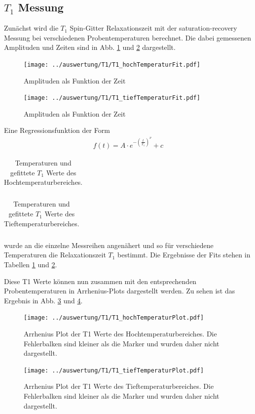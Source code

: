 \subsection{$T_1$ Messung}
Zunächst wird die $T_1$ Spin-Gitter Relaxationszeit mit der saturation-recovery Messung bei verschiedenen Probentemperaturen berechnet. Die dabei gemessenen Amplituden und Zeiten sind in Abb. \ref{pic_T1_hoch} und \ref{pic_T1_tief} dargestellt. 
\begin{figure}[htbp]
	\texttt{[image: ../auswertung/T1/T1\_hochTemperaturFit.pdf]}
	\caption{Amplituden als Funktion der Zeit}
	\label{pic_T1_hoch}
\end{figure}
\begin{figure}[htbp]
	\texttt{[image: ../auswertung/T1/T1\_tiefTemperaturFit.pdf]}
	\caption{Amplituden als Funktion der Zeit}
	\label{pic_T1_tief}
\end{figure}

Eine Regressionsfunktion der Form 
\begin{align}
	f(t) = A\cdot e^{-\left(\frac{t}{T_1}\right)^\nu}+c
\end{align}
\begin{table}[htbp]
	\begin{tabular}{| >{$}c<{$} | >{$}c<{$} | >{$}c<{$} |}
		
	\end{tabular}
	\caption{Temperaturen und gefittete $T_1$ Werte des Hochtemperaturbereiches.}
	\label{tab:T1_hoch}
\end{table}
\begin{table}[htbp]
	\begin{tabular}{| >{$}c<{$} | >{$}c<{$} | >{$}c<{$} |}
		
	\end{tabular}
	\caption{Temperaturen und gefittete $T_1$ Werte des Tieftemperaturbereiches.}
	\label{tab:T1_tief}
\end{table}
wurde an die einzelne Messreihen angenähert und so für verschiedene Temperaturen die Relaxationszeit $T_1$ bestimmt. Die Ergebnisse der Fits stehen in Tabellen \ref{tab:T1_hoch} und \ref{tab:T1_tief}.

Diese T1 Werte können nun zusammen mit den entsprechenden Probentemperaturen in Arrhenius-Plots dargestellt werden. Zu sehen ist das Ergebnis in Abb. \ref{pic_T1Arr_hoch} und \ref{pic_T1Arr_tief}.
\begin{figure}[htbp]
	\texttt{[image: ../auswertung/T1/T1\_hochTemperaturPlot.pdf]}
	\caption{Arrhenius Plot der T1 Werte des Hochtemperaturbereiches. Die Fehlerbalken sind kleiner als die Marker und wurden daher nicht dargestellt.}
	\label{pic_T1Arr_hoch}
\end{figure}
\begin{figure}[htbp]
	\texttt{[image: ../auswertung/T1/T1\_tiefTemperaturPlot.pdf]}
	\caption{Arrhenius Plot der T1 Werte des Tieftemperaturbereiches. Die Fehlerbalken sind kleiner als die Marker und wurden daher nicht dargestellt.}
	\label{pic_T1Arr_tief}
\end{figure}

